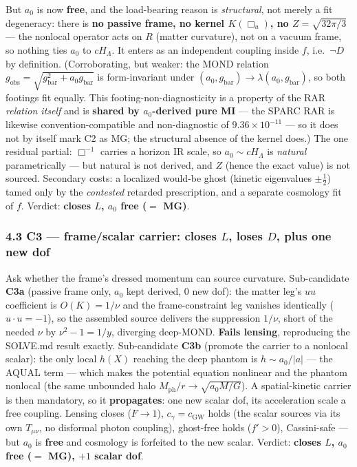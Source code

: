 \documentclass[
]{article}
\begin{document}
But \(a_0\) is now \textbf{free}, and the load-bearing reason is
\emph{structural}, not merely a fit degeneracy: there is \textbf{no
passive frame, no kernel \(K(\Box_u)\), no \(Z=\sqrt{32\pi/3}\)} --- the
nonlocal operator acts on \(R\) (matter curvature), not on a vacuum
frame, so nothing ties \(a_0\) to \(cH_\Lambda\). It enters as an
independent coupling inside \(f\), i.e.~\(\lnot D\) by definition.
(Corroborating, but weaker: the MOND relation
\(g_\mathrm{obs}=\sqrt{g_\mathrm{bar}^2+a_0 g_\mathrm{bar}}\) is form-invariant
under \((a_0,g_\mathrm{bar})\to\lambda(a_0,g_\mathrm{bar})\), so both footings
fit equally. This footing-non-diagnosticity is a property of the RAR
\emph{relation itself} and is \textbf{shared by \(a_0\)-derived pure MI}
--- the SPARC RAR is likewise convention-compatible and non-diagnostic
of \(9.36\times10^{-11}\) --- so it does not by itself mark C2 as MG;
the structural absence of the kernel does.) The one residual partial:
\(\Box^{-1}\) carries a horizon IR scale, so \(a_0\sim cH_\Lambda\) is
\emph{natural} parametrically --- but natural is not derived, and \(Z\)
(hence the exact value) is not sourced. Secondary costs: a localized
would-be ghost (kinetic eigenvalues \(\pm\tfrac12\)) tamed only by the
\emph{contested} retarded prescription, and a separate cosmology fit of
\(f\). Verdict: \textbf{closes \(L\), \(a_0\) free (\(=\) MG)}.

\subsubsection{\texorpdfstring{4.3 C3 --- frame/scalar carrier: closes
\(L\), loses \(D\), plus one new
dof}{4.3 C3 --- frame/scalar carrier: closes L, loses D, plus one new dof}}\label{c3-framescalar-carrier-closes-l-loses-d-plus-one-new-dof}

Ask whether the frame's dressed momentum can source curvature.
Sub-candidate \textbf{C3a} (passive frame only, \(a_0\) kept derived, 0
new dof): the matter leg's \(uu\) coefficient is \(O(K)=1/\nu\) and the
frame-constraint leg vanishes identically (\(u\cdot u=-1\)), so the
assembled source delivers the suppression \(1/\nu\), short of the needed
\(\nu\) by \(\nu^2-1=1/y\), diverging deep-MOND. \textbf{Fails lensing},
reproducing the SOLVE.md result exactly. Sub-candidate \textbf{C3b}
(promote the carrier to a nonlocal scalar): the only local \(h(X)\)
reaching the deep phantom is \(h\sim a_0/|a|\) --- the AQUAL term ---
which makes the potential equation nonlinear and the phantom nonlocal
(the same unbounded halo \(M_\mathrm{ph}/r\to\sqrt{a_0M/G}\)). A
spatial-kinetic carrier is then mandatory, so it \textbf{propagates}:
one new scalar dof, its acceleration scale a free coupling. Lensing
closes (\(F\to1\)), \(c_\gamma=c_\mathrm{GW}\) holds (the scalar sources
via its own \(T_{\mu\nu}\), no disformal photon coupling), ghost-free
holds (\(f'>0\)), Cassini-safe --- but \(a_0\) is \textbf{free} and
cosmology is forfeited to the new scalar. Verdict: \textbf{closes \(L\),
\(a_0\) free (\(=\) MG), \(+1\) scalar dof}.
\end{document}

